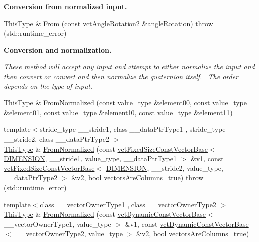 \begin{Indent}{\bf Conversion from normalized input.}
\begin{DoxyCompactItemize}
\item 
\hyperlink{classvct_matrix_rotation2_base_a47ffeef2ddecede4b16bcc88fb432ff5}{This\+Type} \& \hyperlink{classvct_matrix_rotation2_base_afbc1961d916a4e8b6bf6b083a1940304}{From} (const \hyperlink{classvct_angle_rotation2}{vct\+Angle\+Rotation2} \&angle\+Rotation)  throw (std\+::runtime\+\_\+error)
\end{DoxyCompactItemize}
\end{Indent}
\begin{Indent}{\bf Conversion and normalization.}\par
{\em These method will accept any input and attempt to either normalize the input and then convert or convert and then normalize the quaternion itself.~\newline
The order depends on the type of input. }\begin{DoxyCompactItemize}
\item 
\hyperlink{classvct_matrix_rotation2_base_a47ffeef2ddecede4b16bcc88fb432ff5}{This\+Type} \& \hyperlink{classvct_matrix_rotation2_base_a79b7b460ac156625df7fbe74e6b36b08}{From\+Normalized} (const value\+\_\+type \&element00, const value\+\_\+type \&element01, const value\+\_\+type \&element10, const value\+\_\+type \&element11)
\item 
{\footnotesize template$<$stride\+\_\+type \+\_\+\+\_\+stride1, class \+\_\+\+\_\+data\+Ptr\+Type1 , stride\+\_\+type \+\_\+\+\_\+stride2, class \+\_\+\+\_\+data\+Ptr\+Type2 $>$ }\\\hyperlink{classvct_matrix_rotation2_base_a47ffeef2ddecede4b16bcc88fb432ff5}{This\+Type} \& \hyperlink{classvct_matrix_rotation2_base_ae41352b46d2cc7d5ab56c359e7ef2511}{From\+Normalized} (const \hyperlink{classvct_fixed_size_const_vector_base}{vct\+Fixed\+Size\+Const\+Vector\+Base}$<$ \hyperlink{classvct_matrix_rotation2_base_ac10279ed12ec787b1a4833ea02771348acefb9855f54f0cfd782e785c9083e592}{D\+I\+M\+E\+N\+S\+I\+O\+N}, \+\_\+\+\_\+stride1, value\+\_\+type, \+\_\+\+\_\+data\+Ptr\+Type1 $>$ \&v1, const \hyperlink{classvct_fixed_size_const_vector_base}{vct\+Fixed\+Size\+Const\+Vector\+Base}$<$ \hyperlink{classvct_matrix_rotation2_base_ac10279ed12ec787b1a4833ea02771348acefb9855f54f0cfd782e785c9083e592}{D\+I\+M\+E\+N\+S\+I\+O\+N}, \+\_\+\+\_\+stride2, value\+\_\+type, \+\_\+\+\_\+data\+Ptr\+Type2 $>$ \&v2, bool vectors\+Are\+Columns=true)  throw (std\+::runtime\+\_\+error)
\item 
{\footnotesize template$<$class \+\_\+\+\_\+vector\+Owner\+Type1 , class \+\_\+\+\_\+vector\+Owner\+Type2 $>$ }\\\hyperlink{classvct_matrix_rotation2_base_a47ffeef2ddecede4b16bcc88fb432ff5}{This\+Type} \& \hyperlink{classvct_matrix_rotation2_base_a620f23f92a10db631bae364db60bd5aa}{From\+Normalized} (const \hyperlink{classvct_dynamic_const_vector_base}{vct\+Dynamic\+Const\+Vector\+Base}$<$ \+\_\+\+\_\+vector\+Owner\+Type1, value\+\_\+type $>$ \&v1, const \hyperlink{classvct_dynamic_const_vector_base}{vct\+Dynamic\+Const\+Vector\+Base}$<$ \+\_\+\+\_\+vector\+Owner\+Type2, value\+\_\+type $>$ \&v2, bool vectors\+Are\+Columns=true)

\end{DoxyCompactItemize}
\end{Indent}
